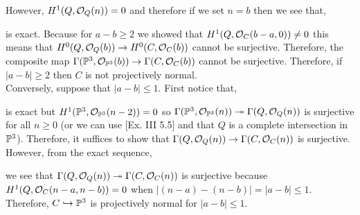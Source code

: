 \documentclass[12pt]{article}
\begin{document}
\begin{enumerate}
\begin{center}
\end{center}
However, $H^1(Q, \struct{Q}(n)) = 0$ and therefore if we set $n = b$ then we see that,
\begin{center}
\end{center}
is exact. Because for $a - b \ge 2$ we showed that $H^1(Q, \struct{C}(b-a,0)) \neq 0$ this means that $H^0(Q, \struct{Q}(b)) \to H^0(C, \struct{C}(b))$ cannot be surjective. Therefore, the composite map $\Gamma(\P^3, \struct{\P^3}(b)) \to \Gamma(C, \struct{C}(b))$ cannot be surjective. Therefore, if $|a - b| \ge 2$ then $C$ is not projectively normal. 
\bigskip\\
Conversely, suppose that $|a - b| \le 1$. First notice that,
\begin{center}
\end{center}
is exact but $H^1(\P^3, \struct{\P^3}(n-2)) = 0$ so $\Gamma(\P^3, \struct{\P^3}(n)) \onto \Gamma(Q, \struct{Q}(n))$ is surjective for all $n \ge 0$ (or we can use [Ex. III 5.5] and that $Q$ is a complete intersection in $\P^3$). Therefore, it suffices to show that $\Gamma(Q, \struct{Q}(n)) \to \Gamma(C, \struct{C}(n))$ is surjective. However, from the exact sequence,
\begin{center}
\end{center}
we see that $\Gamma(Q, \struct{Q}(n)) \onto \Gamma(C, \struct{C}(n))$ is surjective because $H^1(Q, \struct{C}(n-a,n-b)) = 0$ when $| (n - a) - (n - b)| = |a - b| \le 1$. Therefore, $C \embed \P^3$ is projectively normal for $|a - b| \le 1$.


\end{enumerate}
\end{document}
